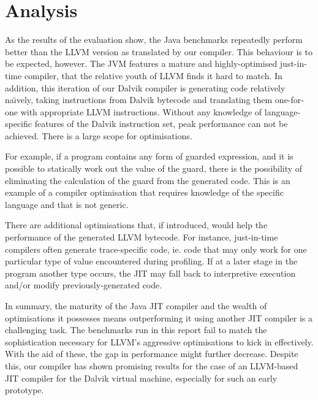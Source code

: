 \section{Analysis}
\label{sec:analysis}

As the results of the evaluation show, the Java benchmarks repeatedly perform better than the LLVM version as translated by our compiler. This behaviour is to be expected, however. The JVM features a mature and highly-optimised just-in-time compiler, that the relative youth of LLVM finds it hard to match. In addition, this iteration of our Dalvik compiler is generating code relatively na\"{\i}vely, taking instructions from Dalvik bytecode and translating them one-for-one with appropriate LLVM instructions. Without any knowledge of language-specific features of the Dalvik instruction set, peak performance can not be achieved. There is a large scope for optimisations.

For example, if a program contains any form of guarded expression, and it is possible to statically work out the value of the guard, there is the possibility of eliminating the calculation of the guard from the generated code. This is an example of a compiler optimisation that requires knowledge of the specific language and that is not generic.

There are additional optimisations that, if introduced, would help the performance of the generated LLVM bytecode. For instance, just-in-time compilers often generate trace-specific code, ie. code that may only work for one particular type of value encountered during profiling. If at a later stage in the program another type occurs, the JIT may fall back to interpretive execution and/or modify previously-generated code.

In summary, the maturity of the Java JIT compiler and the wealth of optimisations it possesses means outperforming it using another JIT compiler is a challenging task. The benchmarks run in this report fail to match the sophistication necessary for LLVM's aggressive optimisations to kick in effectively. With the aid of these, the gap in performance might further decrease. Despite this, our compiler has shown promising results for the case of an LLVM-based JIT compiler for the Dalvik virtual machine, especially for such an early prototype.
